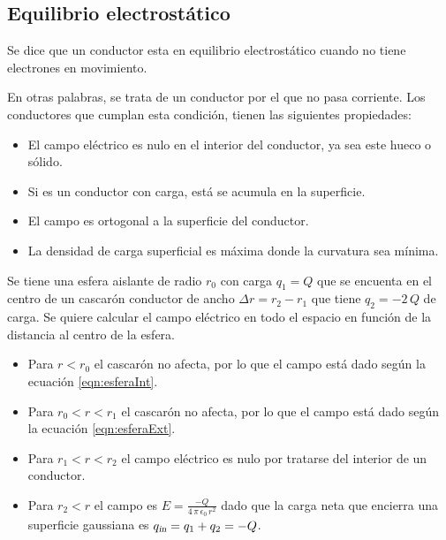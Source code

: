 \subsection{Equilibrio electrostático}

Se dice que un conductor esta en equilibrio electrostático cuando no tiene electrones en movimiento.

En otras palabras, se trata de un conductor por el que no pasa corriente.
Los conductores que cumplan esta condición, tienen las siguientes propiedades:

\begin{itemize}
\item El campo eléctrico es nulo en el interior del conductor, ya sea este hueco o sólido.

\item Si es un conductor con carga, está se acumula en la superficie.

\item El campo es ortogonal a la superficie del conductor.

\item La densidad de carga superficial es máxima donde la curvatura sea mínima.
\end{itemize}

\begin{mdframed}[style=ExampleFrame]
    \begin{example}
    \end{example}
    \begin{formatI}
        Se tiene una esfera aislante de radio $r_0$ con carga $q_1 = Q$ que se encuenta en el centro de un cascarón conductor de ancho $\Delta r = r_2 - r_1$ que tiene $q_2 = -2\,Q$ de carga.
        Se quiere calcular el campo eléctrico en todo el espacio en función de la distancia al centro de la esfera.
    \end{formatI}
    \begin{center}
        \def\svgwidth{0.7\linewidth}
        
    \end{center}
    \begin{itemize}
        \item Para $r<r_0$ el cascarón no afecta, por lo que el campo está dado según la ecuación \ref{eqn:esferaInt}.
        \item Para $r_0<r<r_1$ el cascarón no afecta, por lo que el campo está dado según la ecuación \ref{eqn:esferaExt}.
        \item Para $r_1<r<r_2$ el campo eléctrico es nulo por tratarse del interior de un conductor.
        \item Para $r_2<r$ el campo es $E = \frac{-Q}{4 \, \pi \, \epsilon_0 \, r^2}$ dado que la carga neta que encierra una superficie gaussiana es ${{q}_\textsl{{in}}} = q_1 + q_2 = -Q$.
    \end{itemize}
\end{mdframed}



